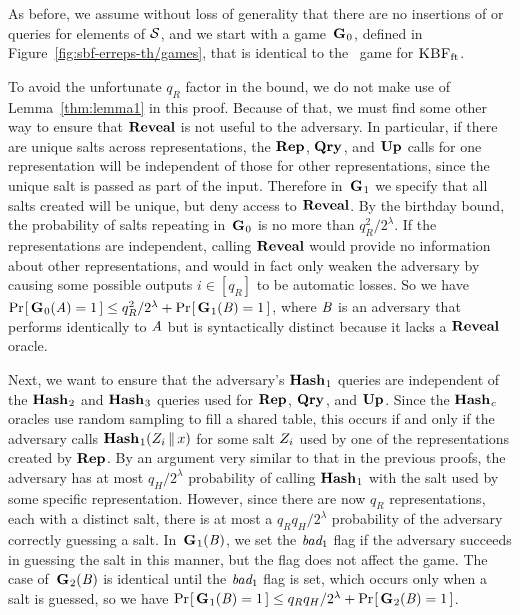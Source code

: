 As before, we assume without loss of generality that there are no insertions of
or queries for elements of $\mathcal{S}$, and we start with a game~$\textup{\textbf{G}}\hspace{0.5pt}_0$, defined
in Figure~\ref{fig:sbf-erreps-th/games}, that is identical to the \erreps\ game for
$\textnormal{\textsc{KBF}}_\mathrm{ft}$.

To avoid the unfortunate $q_R$ factor in the bound, we do not make use of
Lemma~\ref{thm:lemma1} in this proof. Because of that, we must find some other
way to ensure that $\mathbf{Reveal}$ is not useful to the adversary. In particular, if
there are unique salts across representations, the $\textup{\textbf{Rep}}\hspace{0.5pt}$, $\textup{\textbf{Qry}}\hspace{0.5pt}$, and $\textup{\textbf{Up}}\hspace{0.5pt}$
calls for one representation will be independent of those for other
representations, since the unique salt is passed as part of the input. Therefore
in~$\textup{\textbf{G}}\hspace{0.5pt}_1$ we specify that all salts created will be unique, but deny access
to $\mathbf{Reveal}$. By the birthday bound, the probability of salts repeating
in~$\textup{\textbf{G}}\hspace{0.5pt}_0$ is no more than $q_R^2/2^\lambda$. If the representations are
independent, calling $\mathbf{Reveal}$ would provide no information about other
representations, and would in fact only weaken the adversary by causing some
possible outputs $i \in [q_R]$ to be automatic losses. So we have
$\Pr\hspace{-1pt}\left[\,\textup{\textbf{G}}\hspace{0.5pt}_0(\mathit{A}) = 1\,\right] \le q_R^2/2^\lambda + \Pr\hspace{-1pt}\left[\,\textup{\textbf{G}}\hspace{0.5pt}_1(\mathit{B}) = 1\,\right]$,
where $\mathit{B}$ is an adversary that performs identically to $\mathit{A}$ but is
syntactically distinct because it lacks a $\mathbf{Reveal}$ oracle.

Next, we want to ensure that the adversary's $\textup{\textbf{Hash}}\hspace{0.5pt}_1$ queries are independent
of the $\textup{\textbf{Hash}}\hspace{0.5pt}_2$ and $\textup{\textbf{Hash}}\hspace{0.5pt}_3$ queries used for $\textup{\textbf{Rep}}\hspace{0.5pt}$, $\textup{\textbf{Qry}}\hspace{0.5pt}$, and $\textup{\textbf{Up}}\hspace{0.5pt}$.
Since the $\textup{\textbf{Hash}}\hspace{0.5pt}_c$ oracles use random sampling to fill a shared table, this
occurs if and only if the adversary calls
$\textup{\textbf{Hash}}\hspace{0.5pt}_1(Z_i \, \| \, x)$
for some salt $Z_i$ used by one of the representations created by $\textup{\textbf{Rep}}\hspace{0.5pt}$.
By an argument very similar to that in the previous proofs, the adversary has at
most $q_H/2^\lambda$ probability of calling $\textup{\textbf{Hash}}\hspace{0.5pt}_1$ with the salt used by
some specific representation. However, since there are now $q_R$
representations, each with a distinct salt, there is at most a
$q_Rq_H/2^\lambda$ probability of the adversary correctly guessing a salt.
In~$\textup{\textbf{G}}\hspace{0.5pt}_1(\mathit{B})$, we set the $\textit{bad}_1$ flag if the adversary succeeds in
guessing the salt in this manner, but the flag does not affect the game. The
case of~$\textup{\textbf{G}}\hspace{0.5pt}_2(\mathit{B})$ is identical until the $\textit{bad}_1$ flag is set, which
occurs only when a salt is guessed, so we have $\Pr\hspace{-1pt}\left[\,\textup{\textbf{G}}\hspace{0.5pt}_1(\mathit{B}) = 1\,\right] \le
q_Rq_H/2^\lambda + \Pr\hspace{-1pt}\left[\,\textup{\textbf{G}}\hspace{0.5pt}_2(\mathit{B}) = 1\,\right]$.

